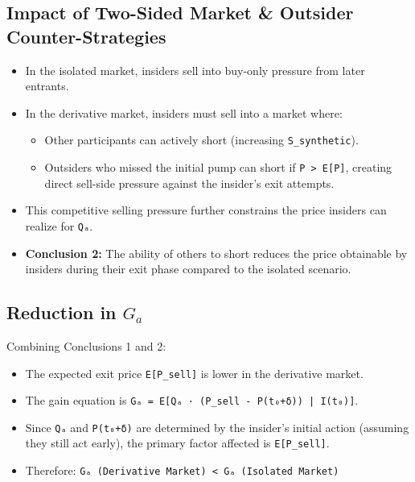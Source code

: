 \documentclass{article}
\begin{document}
\subsection{Impact of Two-Sided Market & Outsider Counter-Strategies}
\begin{itemize}
    \item In the isolated market, insiders sell into buy-only pressure from later entrants.
    \item In the derivative market, insiders must sell into a market where:
        \begin{itemize}
            \item Other participants can actively short (increasing \lstinline{S_synthetic}).
            \item Outsiders who missed the initial pump can short if \lstinline{P > E[P]}, creating direct sell-side pressure against the insider's exit attempts.
        \end{itemize}
    \item This competitive selling pressure further constrains the price insiders can realize for \lstinline{Qₐ}.
    \item \textbf{Conclusion 2:} The ability of others to short reduces the price obtainable by insiders during their exit phase compared to the isolated scenario.
\end{itemize}

\subsection{Reduction in $G_a$}
Combining Conclusions 1 and 2:
\begin{itemize}
    \item The expected exit price \lstinline{E[P_sell]} is lower in the derivative market.
    \item The gain equation is \lstinline{Gₐ = E[Qₐ · (P_sell - P(t₀+δ)) | I(t₀)]}.
    \item Since \lstinline{Qₐ} and \lstinline{P(t₀+δ)} are determined by the insider's initial action (assuming they still act early), the primary factor affected is \lstinline{E[P_sell]}.
    \item Therefore: \lstinline{Gₐ (Derivative Market) < Gₐ (Isolated Market)}
\end{itemize}
\end{document}
